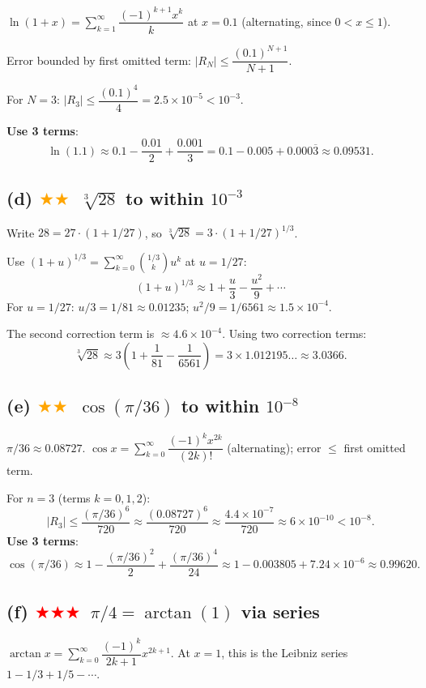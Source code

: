 \documentclass[12pt,a4paper]{article}
\newcommand{\medium}{\textcolor{orange}{$\bigstar\bigstar$}}
\newcommand{\hard}{\textcolor{red}{$\bigstar\bigstar\bigstar$}}
\begin{document}
$\ln(1+x)=\sum_{k=1}^{\infty}\dfrac{(-1)^{k+1}x^k}{k}$ at $x=0.1$ (alternating, since $0<x\leq 1$).

Error bounded by first omitted term: $|R_N|\leq\dfrac{(0.1)^{N+1}}{N+1}$.

For $N=3$: $|R_3|\leq\dfrac{(0.1)^4}{4}=2.5\times10^{-5}<10^{-3}$.

\textbf{Use 3 terms}:
\[
  \ln(1.1)\approx 0.1-\frac{0.01}{2}+\frac{0.001}{3}
  = 0.1-0.005+0.000\overline{3}
  \approx \mathbf{0.09531}.
\]

\subsection*{(d) \medium\ $\sqrt[3]{28}$ to within $10^{-3}$}

Write $28=27\cdot(1+1/27)$, so $\sqrt[3]{28}=3\cdot(1+1/27)^{1/3}$.

Use $(1+u)^{1/3}=\sum_{k=0}^{\infty}\binom{1/3}{k}u^k$ at $u=1/27$:
\[
  (1+u)^{1/3}\approx 1+\frac{u}{3}-\frac{u^2}{9}+\cdots
\]
For $u=1/27$: $u/3=1/81\approx0.01235$; $u^2/9=1/6561\approx1.5\times10^{-4}$.

The second correction term is $\approx4.6\times10^{-4}$.  Using two correction terms:
\[
  \sqrt[3]{28}\approx 3\left(1+\frac{1}{81}-\frac{1}{6561}\right)
  = 3\times1.012195\ldots\approx\mathbf{3.0366}.
\]

\subsection*{(e) \medium\ $\cos(\pi/36)$ to within $10^{-8}$}

$\pi/36\approx0.08727$.  $\cos x=\sum_{k=0}^{\infty}\dfrac{(-1)^k x^{2k}}{(2k)!}$ (alternating); error $\leq$ first omitted term.

For $n=3$ (terms $k=0,1,2$):
\[
  |R_3|\leq\frac{(\pi/36)^6}{720}\approx\frac{(0.08727)^6}{720}\approx\frac{4.4\times10^{-7}}{720}\approx6\times10^{-10}<10^{-8}.
\]
\textbf{Use 3 terms}:
\[
  \cos(\pi/36)\approx 1-\frac{(\pi/36)^2}{2}+\frac{(\pi/36)^4}{24}
  \approx 1-0.003805+7.24\times10^{-6}
  \approx\mathbf{0.99620}.
\]

\subsection*{(f) \hard\ $\pi/4=\arctan(1)$ via series}

$\arctan x=\sum_{k=0}^{\infty}\dfrac{(-1)^k}{2k+1}x^{2k+1}$.  At $x=1$, this is the Leibniz series $1-1/3+1/5-\cdots$.
\end{document}
